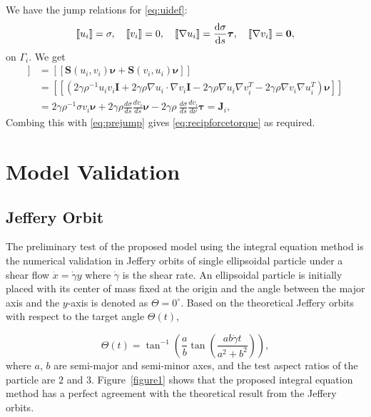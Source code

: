 \documentclass[lineno]{jfm}
\newcommand{\JJ}{\mathbf{J}}
\newcommand{\nnu}{\boldsymbol{\nu}}
\newcommand{\ttau}{\boldsymbol{\tau}}
\newcommand{\jump}[1]{[\![ #1 ]\!]}
\begin{document}
We have the jump relations for \eqref{eq:uidef}: 
\begin{equation}
\label{eq:DLjump}
\jump{u_i} = \sigma, \quad
\jump{v_i} = 0, \quad
\jump{\nabla u_i} = \frac{\dif \sigma}{\dif s}\ttau,\quad
\jump{\nabla v_i} = \mathbf{0},
\end{equation}
on $\Gamma_i$. We get 
\begin{align*}
  \jump{{\bf T}_2\nnu}   &= \jump{\mathbf{S}(u_i,v_i)\nnu  +\mathbf{S}(v_i,u_i)\nnu} \\
  &= \jump{( 2\gamma\rho^{-1} u_i v_i \mathbf{I} + 2\gamma\rho \nabla u_i \cdot \nabla v_i \mathbf{I} 
- 2\gamma\rho \nabla u_i  \nabla v_i^T - 2\gamma\rho \nabla v_i \nabla u_i^T)  \nnu}\\
&= 2\gamma\rho^{-1} \sigma v_i \nnu + 2\gamma\rho \frac{d\sigma }{ds}\frac{dv_i }{ds} \nnu
- 2\gamma\rho \ \frac{d\sigma }{ds} \frac{dv_i }{d\nu} \ttau = \JJ_i,
\end{align*}
Combing  this with \eqref{eq:prejump}  gives  \eqref{eq:recipforcetorque}
as required. 





\section{\label{validation}Model Validation}

\subsection{Jeffery Orbit}
The preliminary test of the proposed model using the integral equation method is the numerical validation in Jeffery orbits of single ellipsoidal particle under a shear flow $\dot x = \dot\gamma y$ where $\dot\gamma$ is the shear rate. An ellipsoidal particle is initially placed with its center of mass fixed at the origin and the angle between the major axis and the $y$-axis is denoted as $\Theta = 0^\circ$. Based on the theoretical Jeffery orbits with respect to the target angle $\Theta(t)$, 

\begin{equation}
\Theta(t) = \tan^{-1}\left(\frac{a}{b}\tan \left(\frac{ab \dot\gamma t}{a^2+b^2}\right)\right),
\end{equation}
%
where $a$, $b$ are semi-major and semi-minor axes, and the test aspect ratios of the particle are $2$ and $3$. Figure~\ref{figure1} shows that the proposed integral equation method has a perfect agreement with the theoretical result from the Jeffery orbits.
\end{document}
